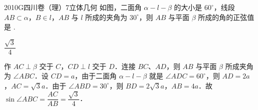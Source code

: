 
\begin{problem}{2010}{G}{四川卷（理）}{7}{立体几何}
如图，二面角 $\alpha-l-\beta$ 的大小是 $60^\circ$，线段 $AB\subset\alpha$，$B\in l$，$AB$ 与 $l$ 所成的夹角为 $30^\circ$，则 $AB$ 与平面 $\beta$ 所成的角的正弦值是 \underline{\hspace{4em}}.
\end{problem}

\begin{answer}
$\dfrac{\sqrt{3}}{4}$
\end{answer}

\begin{solutions}

作 $AC\perp\beta$ 交于 $C$，$CD\perp l$ 交于 $D$．连接 $BC$、$AD$，则 $AB$ 与平面 $\beta$ 所成夹角为 $\angle ABC$．设 $CD=a$，由于二面角 $\alpha-l-\beta$ 就是 $\angle ADC=60^\circ$，则 $AD=2a$，$AC=\sqrt{3}a$．由于 $\angle ABD=30^\circ$，则 $BD=2\sqrt{3}a$，$AB=4a$．故 $\sin\angle ABC=\dfrac{AC}{AB}=\dfrac{\sqrt{3}}{4}$．
\end{solutions}